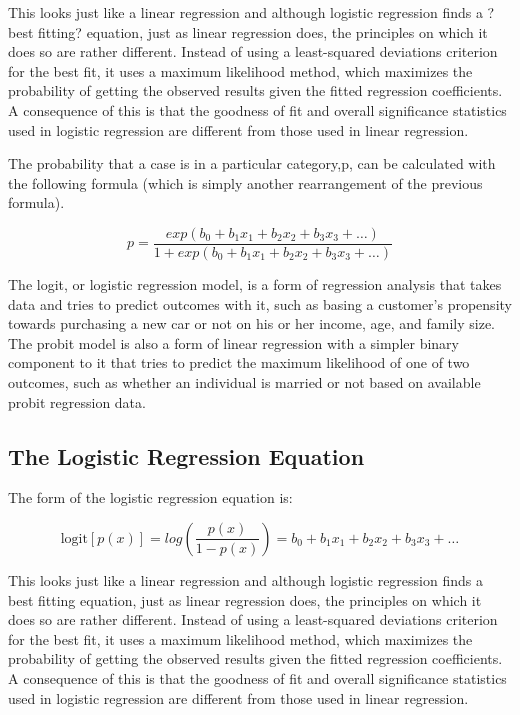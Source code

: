 \documentclass[a4paper,12pt]{article}
\begin{document}
This looks just like a linear regression and although logistic regression finds a ?best
fitting? equation, just as linear regression does, the principles on which it does so are
rather different. Instead of using a least-squared deviations criterion for the best fit, it
uses a maximum likelihood method, which maximizes the probability of getting the
observed results given the fitted regression coefficients. A consequence of this is that the
goodness of fit and overall significance statistics used in logistic regression are different
from those used in linear regression.

The probability that a case is in a particular category,p, can be calculated with the following formula (which is simply another rearrangement of the previous formula).

\[p = \frac{exp(b_0 + b_1x_1 + b_2x_2 + b_3x_3 + \ldots)}{1 + exp(b_0 + b_1x_1 + b_2x_2 + b_3x_3 + \ldots)}\]


The logit, or logistic regression model, is a form of regression analysis that takes data and tries to predict outcomes with it, such as basing a customer's propensity towards purchasing a new car or not on his or her income, age, and family size. The probit model is also a form of linear regression with a simpler binary component to it that tries to predict the maximum likelihood of one of two outcomes, such as whether an individual is married or not based on available probit regression data.

\newpage

\subsection{The Logistic Regression Equation}
The form of the logistic regression equation is:
\begin{framed}
	\[ \mbox{logit}[p(x)] =  log \left(\frac{p(x)}{1-p(x)} \right) = b_0 + b_1x_1 + b_2x_2 + b_3x_3 + \ldots \]
\end{framed}
This looks just like a linear regression and although logistic regression finds a best
fitting equation, just as linear regression does, the principles on which it does so are
rather different. Instead of using a least-squared deviations criterion for the best fit, it
uses a maximum likelihood method, which maximizes the probability of getting the
observed results given the fitted regression coefficients. A consequence of this is that the
goodness of fit and overall significance statistics used in logistic regression are different
from those used in linear regression.
\end{document}
